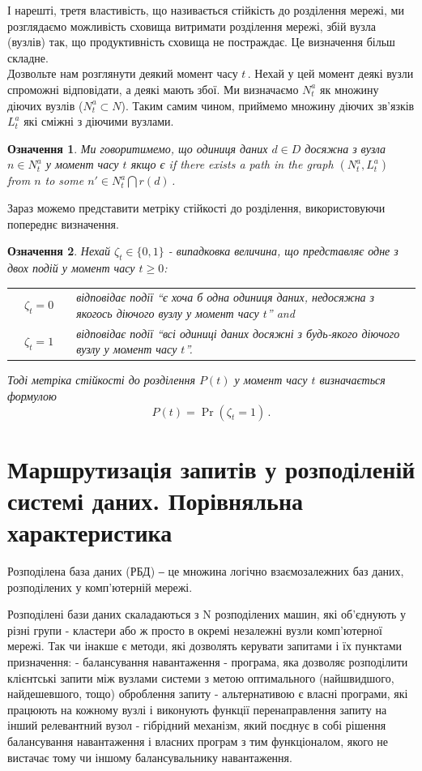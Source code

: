 \documentclass[14pt]{vakthesis}
\newtheorem{definition}{Означення}[chapter]
\begin{document}
І нарешті, третя властивість, що називається стійкість до розділення мережі,
ми розглядаємо можливість сховища витримати розділення мережі, збій вузла (вузлів) так, що
продуктивність сховища не постраждає. 
Це визначення більш складне.
\\
Дозвольте нам розглянути деякий момент часу $t$\,.
Нехай у цей момент деякі вузли спроможні відповідати, а деякі мають збої.
Ми визначаємо  $N_t^a$ як множину діючих вузлів ($N_t^a\subset N$).
Таким самим чином, приймемо множину діючих зв'язків $L_t^a$ які сміжні з діючими вузлами.
\begin{definition}
Ми говоритимемо, що одиниця даних $d\in D$ досяжна з вузла $n\in N_t^a$ у момент часу $t$
якщо є if there exists a path in the graph $(N_t^a,L_t^a)$ from $n$ to some $n'\in N_t^a\bigcap r(d)$\,.
\end{definition}
Зараз можемо представити метріку стійкості до розділення, використовуючи попереднє визначення.
\begin{definition}
Нехай $\zeta_t\in\{0,1\}$ - випадковка величина, що представляє одне з двох подій у момент часу $t\geq 0$:\\
\begin{tabular*}{\textwidth}{p{0.5cm}cp{0.5cm}p{}}
&$\zeta_t=0$ && відповідає події ``є хоча б одна одиниця даних, недосяжна з якогось 
діючого вузлу у момент часу  $t$'' and\\
&$\zeta_t=1$ && відповідає події ``всі одиниці даних досяжні з будь-якого діючого вузлу 
у момент часу $t$''.
\end{tabular*}

Тоді метріка стійкості до розділення  $P(t)$ у момент часу $t$ визначається формулою
\begin{equation}
	P(t)=\Pr(\zeta_t=1)\,.
\end{equation}
\end{definition}

\chapter{Маршрутизація запитів у розподіленій системі даних. Порівняльна характеристика}

Розподілена база даних (РБД) ‒ це множина логічно взаємозалежних баз даних, розподілених у комп’ютерній мережі.

Розподілені бази даних  скаладаються з N розподілених машин, які об'єднують у різні групи - кластери або ж просто в окремі незалежні вузли комп'ютерної мережі.
Так чи інакше є методи, які дозволять керувати запитами і їх пунктами призначення:
 - балансування навантаження - програма, яка дозволяє розподілити клієнтські запити між вузлами системи з метою оптимального (найшвидшого, найдешевшого, тощо) оброблення запиту
 - альтернативою є власні програми, які працюють на кожному вузлі і виконують функції перенаправлення запиту на інший релевантний вузол
 - гібрідний механізм, який поєднує в собі рішення балансування навантаження і власних програм з тим функціоналом, якого не вистачає тому чи іншому балансувальнику навантаження.
\end{document}
